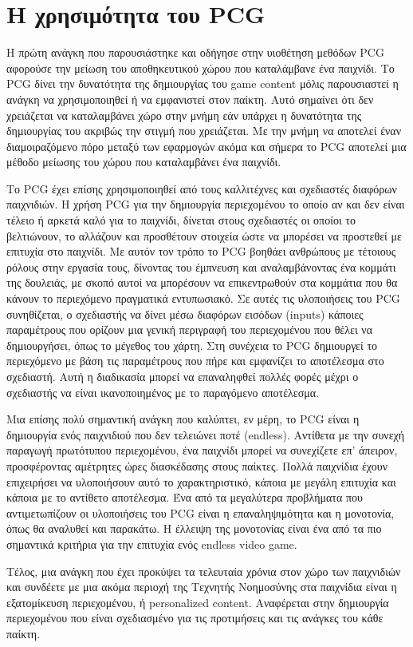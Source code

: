 \section{Η χρησιμότητα του PCG}
	Η πρώτη ανάγκη που παρουσιάστηκε και οδήγησε στην υιοθέτηση μεθόδων PCG αφορούσε την μείωση του αποθηκευτικού χώρου που καταλάμβανε ένα παιχνίδι. Το PCG δίνει την δυνατότητα της δημιουργίας του game content μόλις παρουσιαστεί η ανάγκη να χρησιμοποιηθεί ή να εμφανιστεί στον παίκτη. Αυτό σημαίνει ότι δεν χρειάζεται να καταλαμβάνει χώρο στην μνήμη εάν υπάρχει η δυνατότητα της δημιουργίας του ακριβώς την στιγμή που χρειάζεται. Με την μνήμη να αποτελεί έναν διαμοιραζόμενο πόρο μεταξύ των εφαρμογών ακόμα και σήμερα το PCG αποτελεί μια μέθοδο μείωσης του χώρου που καταλαμβάνει ένα παιχνίδι.
\par
	Το PCG έχει επίσης χρησιμοποιηθεί από τους καλλιτέχνες και σχεδιαστές διαφόρων παιχνιδιών. Η χρήση PCG για την δημιουργία περιεχομένου το οποίο αν και δεν είναι τέλειο ή αρκετά καλό για το παιχνίδι, δίνεται στους σχεδιαστές οι οποίοι το βελτιώνουν, το αλλάζουν και προσθέτουν στοιχεία ώστε να μπορέσει να προστεθεί με επιτυχία στο παιχνίδι. Με αυτόν τον τρόπο το PCG βοηθάει ανθρώπους με τέτοιους ρόλους στην εργασία τους, δίνοντας του έμπνευση και αναλαμβάνοντας ένα κομμάτι της δουλειάς, με σκοπό αυτοί να μπορέσουν να επικεντρωθούν στα κομμάτια που θα κάνουν το περιεχόμενο πραγματικά εντυπωσιακό. Σε αυτές τις υλοποιήσεις του PCG συνηθίζεται, ο σχεδιαστής να δίνει μέσω διαφόρων εισόδων (inputs) κάποιες παραμέτρους που ορίζουν μια γενική περιγραφή του περιεχομένου που θέλει να δημιουργήσει, όπως το μέγεθος του χάρτη. Στη συνέχεια το PCG δημιουργεί το περιεχόμενο με βάση τις παραμέτρους που πήρε και εμφανίζει το αποτέλεσμα στο σχεδιαστή. Αυτή η διαδικασία μπορεί να επαναληφθεί πολλές φορές μέχρι ο σχεδιαστής να είναι ικανοποιημένος με το παραγόμενο αποτέλεσμα.  \cite{pcgieee}
\par
	Μια επίσης πολύ σημαντική ανάγκη που καλύπτει, εν μέρη, το PCG είναι η δημιουργία ενός παιχνιδιού που δεν τελειώνει ποτέ (endless). Αντίθετα με την συνεχή παραγωγή πρωτότυπου περιεχομένου, ένα παιχνίδι μπορεί να συνεχίζετε επ’ άπειρον, προσφέροντας αμέτρητες ώρες διασκέδασης στους παίκτες. Πολλά παιχνίδια έχουν επιχειρήσει να υλοποιήσουν αυτό το χαρακτηριστικό, κάποια με μεγάλη επιτυχία και κάποια με το αντίθετο αποτέλεσμα. Ένα από τα μεγαλύτερα προβλήματα που αντιμετωπίζουν οι υλοποιήσεις του PCG είναι η επαναληψιμότητα και η μονοτονία, όπως θα αναλυθεί και παρακάτω. Η έλλειψη της μονοτονίας είναι ένα από τα πιο σημαντικά κριτήρια για την επιτυχία ενός endless video game.
\par
	Τέλος, μια ανάγκη που έχει προκύψει τα τελευταία χρόνια στον χώρο των παιχνιδιών και συνδέετε με μια ακόμα περιοχή της Τεχνητής Νοημοσύνης στα παιχνίδια είναι η εξατομίκευση περιεχομένου, ή personalized content. Αναφέρεται στην δημιουργία περιεχομένου που είναι σχεδιασμένο για τις προτιμήσεις και τις ανάγκες του κάθε παίκτη.


